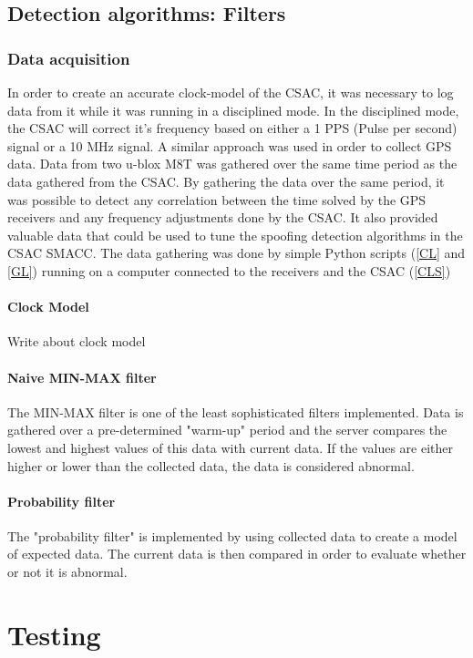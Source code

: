 \documentclass[12pt,english,a4paper]{report}
\begin{document}
\section{Detection algorithms: Filters}
\subsection{Data acquisition}\label{data_aquisition}
In order to create an accurate clock-model of the CSAC, it was necessary to log data from it while it was running in a disciplined mode. In the disciplined mode, the CSAC will correct it's frequency based on either a 1 PPS (Pulse per second) signal or a 10 MHz signal. A similar approach was used in order to collect GPS data. Data from two u-blox M8T was gathered over the same time period as the data gathered from the CSAC. By gathering the data over the same period, it was possible to detect any correlation between the time solved by the GPS receivers and any frequency adjustments done by the CSAC. It also provided valuable data that could be used to tune the spoofing detection algorithms in the CSAC SMACC. The data gathering was done by simple Python scripts (\ref{CL} and \ref{GL}) running on a computer connected to the receivers and the CSAC (\ref{CLS})

\subsubsection{Clock Model}
Write about clock model

\subsubsection{Naive MIN-MAX filter}
The MIN-MAX filter is one of the least sophisticated filters implemented. Data is gathered over a pre-determined "warm-up" period and the server compares the lowest and highest values of this data with current data. If the values are either higher or lower than the collected data, the data is considered abnormal. 

\subsubsection{Probability filter}
The "probability filter" is implemented by using collected data to create a model of expected data. The current data is then compared in order to evaluate whether or not it is abnormal. 

\chapter{Testing}
\end{document}
